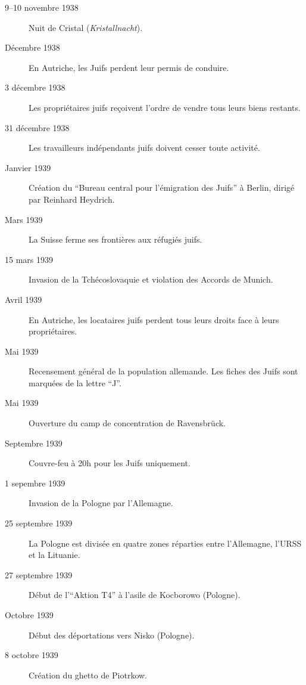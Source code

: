\begin{description}
    \item[9--10 novembre 1938] Nuit de Cristal (\textit{Kristallnacht}).    
    
    \item[Décembre 1938] En Autriche, les Juifs perdent leur permis de conduire.

    \item[3 décembre 1938] Les propriétaires juifs reçoivent l'ordre de vendre tous leurs biens restants.
    
    \item[31 décembre 1938] Les travailleurs indépendants juifs doivent cesser toute activité.

    \item[Janvier 1939] Création du \enquote{Bureau central pour l'émigration des Juifs} à Berlin, dirigé par Reinhard Heydrich.
    
    \item[Mars 1939] La Suisse ferme ses frontières aux réfugiés juifs.

    \item[15 mars 1939] Invasion de la Tchécoslovaquie et violation des Accords de Munich.

    \item[Avril 1939] En Autriche, les locataires juifs perdent tous leurs droits face à leurs propriétaires.
    
    \item[Mai 1939] Recensement général de la population allemande. Les fiches des Juifs sont marquées de la lettre \enquote{J}.
    \item[Mai 1939] Ouverture du camp de concentration de  Ravensbrück.
    
    \item[Septembre 1939] Couvre-feu à 20h pour les Juifs uniquement.

    \item[1\ier{} sepembre 1939] Invasion de la Pologne par l'Allemagne.

    \item[25 septembre 1939] La Pologne est divisée en quatre zones réparties entre l'Allemagne, l'URSS et la Lituanie.
    
    \item[27 septembre 1939] Début de l'\enquote{Aktion T4} à l'asile de Kocborowo (Pologne).

    \item[Octobre 1939] Début des déportations vers Nisko (Pologne).
    
    \item[8 octobre 1939] Création du ghetto de Piotrkow.
    

\end{description}

